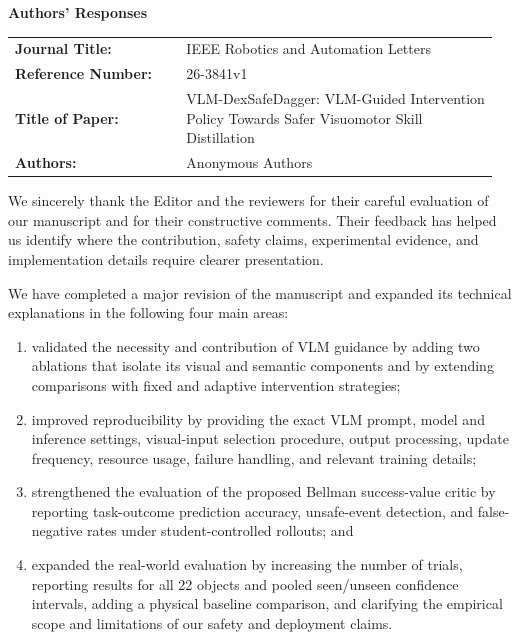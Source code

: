 \documentclass[12pt]{article}
\newcommand{\manuscriptid}{26-3841v1}
\newcommand{\papertitle}{VLM-DexSafeDagger: VLM-Guided Intervention Policy Towards Safer Visuomotor Skill Distillation}
\newcounter{reviewer}
\begin{document}
\begingroup

\begin{center}
  {\Large\bfseries Authors' Responses}\par
\end{center}

\vspace{2em}
\begin{tabular}{@{}p{0.34\linewidth}p{0.62\linewidth}@{}}
\textbf{Journal Title:} & IEEE Robotics and Automation Letters \\
\textbf{Reference Number:} & \manuscriptid \\
\textbf{Title of Paper:} & \papertitle \\
\textbf{Authors:} & Anonymous Authors
\end{tabular}

\vspace{2em}
We sincerely thank the Editor and the reviewers for their careful evaluation
of our manuscript and for their constructive comments. Their feedback has
helped us identify where the contribution, safety claims, experimental
evidence, and implementation details require clearer presentation.

We have completed a major revision of the manuscript and expanded its technical
explanations in the following four main areas:
\begin{enumerate}[label=\arabic*)]
  \item validated the necessity and contribution of VLM guidance by adding two
  ablations that isolate its visual and semantic components and by extending
  comparisons with fixed and adaptive intervention strategies;
  \item improved reproducibility by providing the exact VLM prompt, model and
  inference settings, visual-input selection procedure, output processing,
  update frequency, resource usage, failure handling, and relevant training
  details;
  \item strengthened the evaluation of the proposed Bellman success-value
  critic by reporting task-outcome prediction accuracy, unsafe-event detection,
  and false-negative rates under student-controlled rollouts; and
  \item expanded the real-world evaluation by increasing the number of trials,
  reporting results for all 22 objects and pooled seen/unseen confidence
  intervals, adding a
  physical baseline comparison, and clarifying the empirical scope and
  limitations of our safety and deployment claims.
\end{enumerate}
\end{document}
